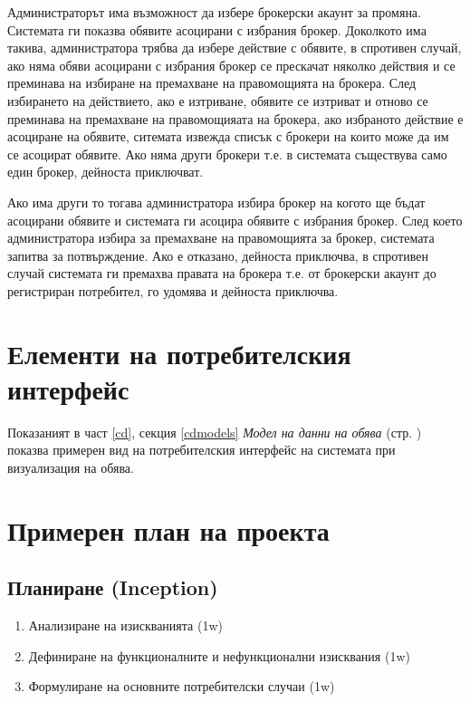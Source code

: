 \documentclass[a4paper]{article}
\begin{document}
Администраторът има възможност да избере
брокерски акаунт за промяна. Системата ги показва обявите асоцирани с избрания брокер. 
Доколкото има такива, администратора трябва да избере действие с обявите, в спротивен 
случай, ако няма обяви асоцирани с избрания брокер се прескачат няколко действия и се 
преминава на избиране на премахване на правомощията на брокера. След избирането на 
действието, ако е изтриване, обявите се изтриват и отново се преминава на премахване 
на правомощияата на брокера, ако избраното действие е асоциране на обявите, ситемата 
извежда списък с брокери на които може да им се асоцират обявите. Ако няма други 
брокери т.е. в системата съществува само един брокер, дейноста приключват.

Ако има други то тогава администратора избира брокер на когото ще бъдат асоцирани
обявите и системата ги асоцира обявите с избрания брокер. След което администратора
избира за премахване на правомощията за брокер, системата запитва за потвърждение.
Ако е отказано, дейноста приключва, в спротивен случай системата ги премахва правата
на брокера т.е. от брокерски акаунт до регистриран потребител, го удомява и дейноста 
приключва.


\clearpage
\section{Елементи на потребителския интерфейс}

Показаният в част \ref{cd}, секция \ref{cdmodels} \emph{Модел на данни на обява} (стр. \pageref{artad}) показва примерен вид на потребителския интерфейс на системата при визуализация на обява.

\section{Примерен план на проекта}

\subsection{Планиране (Inception)} %
\begin{enumerate}
\item Анализиране на изискванията (1w)
\item Дефиниране на функционалните и нефункционални изисквания (1w)
\item Формулиране на основните потребителски случаи (1w)
\end{enumerate}
\end{document}
